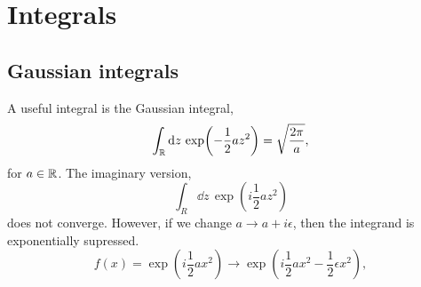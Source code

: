 \section{Integrals}
\subsection{Gaussian integrals}
A useful integral is the Gaussian integral,
\begin{equation}
    \int_{\mathbb{R}} \dd z \, \exp(- \frac{1}{2} a z^2) = \sqrt{\frac{2 \pi}{a}},
\end{equation}
for $a \in \mathbb{R}$. The imaginary version,
\begin{equation}
    \int_R \dd z \, \exp(i \frac{1}{2} a z^2 )
\end{equation}
does not converge. However, if we change $a \rightarrow a + i\epsilon$, 
then the integrand is exponentially supressed.
\begin{equation}
    f(x) = \exp(i \frac{1}{2}a x^2) \rightarrow
    \exp(i\frac{1}{2}a x^2 - \frac{1}{2} \epsilon  x^2),
\end{equation}
